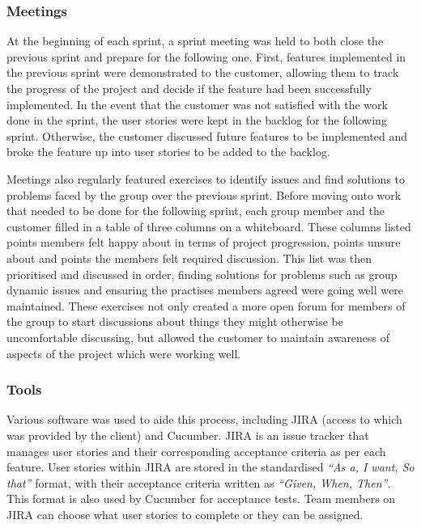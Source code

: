 \documentclass[a4paper, 12pt, twoside]{article}
\begin{document}
\subsubsection{Meetings}

At the beginning of each sprint, a sprint meeting was held to both close the previous sprint and prepare for the following one. First, features implemented in the previous sprint were demonstrated to the customer, allowing them to track the progress of the project and decide if the feature had been successfully implemented. In the event that the customer was not satisfied with the work done in the sprint, the user stories were kept in the backlog for the following sprint. Otherwise, the customer discussed future features to be implemented and broke the feature up into user stories to be added to the backlog.

Meetings also regularly featured exercises to identify issues and find solutions to problems faced by the group over the previous sprint. Before moving onto work that needed to be done for the following sprint, each group member and the customer filled in a table of three columns on a whiteboard. These columns listed points members felt happy about in terms of project progression, points unsure about and points the members felt required discussion. This list was then prioritised and discussed in order, finding solutions for problems such as group dynamic issues and ensuring the practises members agreed were going well were maintained. These exercises not only created a more open forum for members of the group to start discussions about things they might otherwise be uncomfortable discussing, but allowed the customer to maintain awareness of aspects of the project which were working well.

\subsubsection{Tools}

Various software was used to aide this process, including JIRA (access to which was provided by the client) and Cucumber. JIRA is an issue tracker that manages user stories and their corresponding acceptance criteria as per each feature. User stories within JIRA are stored in the standardised \emph{``As a, I want, So that''} format, with their acceptance criteria written as \emph{``Given, When, Then''}. This format is also used by Cucumber for acceptance tests. Team members on JIRA can choose what user stories to complete or they can be assigned.
\end{document}
